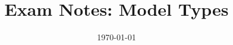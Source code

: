 \documentclass[11pt,oneside]{report}
\begin{document}
\title{Exam Notes: Model Types}
\author{}
\date{\today}
\maketitle
\tableofcontents
\clearpage













\end{document}

